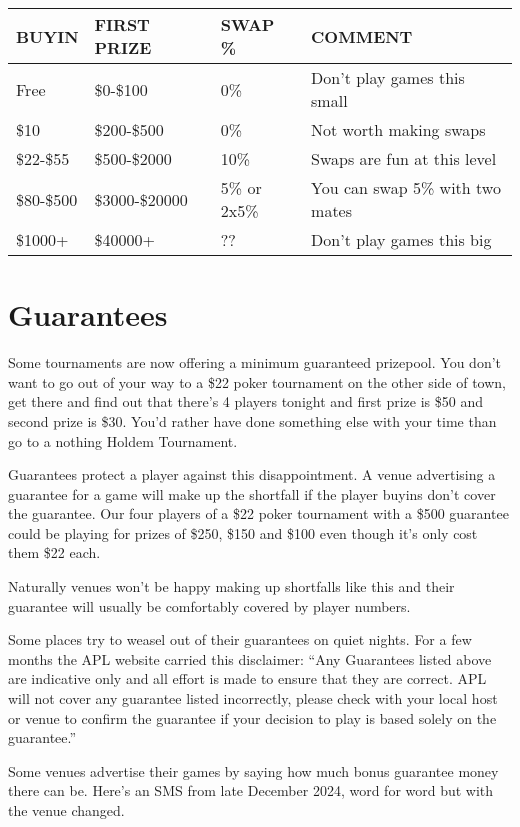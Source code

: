 \begin{tabular}{|l|l|l|l|} \hline
BUYIN      & FIRST PRIZE    & SWAP \% & COMMENT\\ \hline
Free       & \$0-\$100      & 0\%     & Don't play games this small \\ \hline
\$10       & \$200-\$500    & 0\%     & Not worth making swaps \\ \hline
\$22-\$55  & \$500-\$2000   & 10\%    & Swaps are fun at this level \\ \hline
\$80-\$500 & \$3000-\$20000 & 5\% or 2x5\% & You can swap 5\% with two mates \\ \hline
\$1000+    & \$40000+ & ?? & Don't play games this big \\ \hline
\end{tabular}

\section{Guarantees}

Some tournaments are now offering a minimum guaranteed prizepool. You
don't want to go out of your way to a \$22 poker tournament on the
other side of town, get there and find out that there's 4 players tonight
and first prize is \$50 and second prize is \$30. You'd rather have
done something else with your time than go to a nothing Holdem Tournament.

Guarantees protect a player against this disappointment. A venue
advertising a guarantee for a game will make up the shortfall if the
player buyins don't cover the guarantee. Our four players of a \$22
poker tournament with a \$500 guarantee could be playing for prizes
of \$250, \$150 and \$100 even though it's only cost them \$22 each.

Naturally venues won't be happy making up shortfalls like this and
their guarantee will usually be comfortably covered by player numbers.

Some places try to weasel out of their guarantees on quiet nights.
For a few months the APL website carried this disclaimer:
``Any Guarantees listed above are indicative only and all effort
is made to ensure that they are correct. APL will not cover
any guarantee listed incorrectly, please check with your local
host or venue to confirm the guarantee if your decision to
play is based solely on the guarantee.''

Some venues advertise their games by saying how much bonus
guarantee money there can be. Here's an SMS from late December 2024,
word for word but with the venue changed.

